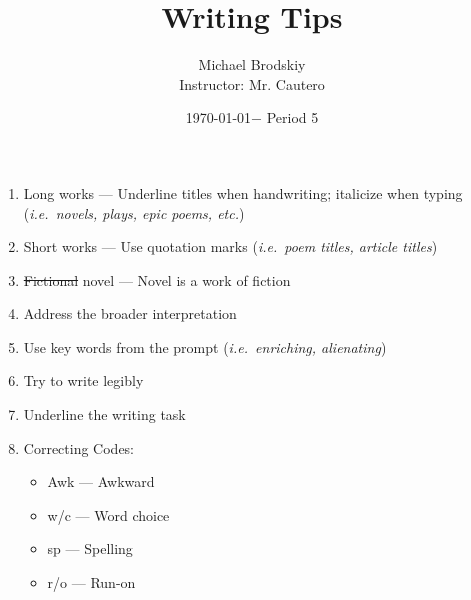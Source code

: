 \documentclass[12pt]{article}
\title{Writing Tips}
\date{\today $-$ Period 5}
\author{Michael Brodskiy\\ \small Instructor: Mr. Cautero}
\begin{document}
\maketitle

\begin{enumerate}

  \item Long works — Underline titles when handwriting; italicize when typing (\textit{i.e.\ novels, plays, epic poems, etc.})

  \item Short works — Use quotation marks (\textit{i.e.\ poem titles, article titles})

  \item \st{Fictional} novel — Novel is a work of fiction

  \item Address the broader interpretation

  \item Use key words from the prompt (\textit{i.e.\ enriching, alienating})

  \item Try to write legibly

  \item Underline the writing task

  \item Correcting Codes:

    \begin{itemize}

      \item Awk — Awkward

      \item w/c — Word choice

      \item sp — Spelling

      \item r/o — Run-on

    \end{itemize}

\end{enumerate}
\end{document}
